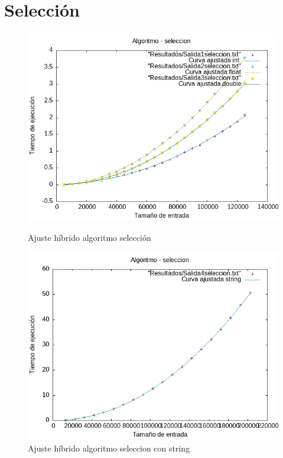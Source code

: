 \documentclass[11pt,openany]{book}
\begin{document}
\section*{Selección}
\begin{figure}[H]
    \begin{minipage}{0.5\textwidth}
        \centering
        \includegraphics[width=\linewidth]{assets/AjusteHibrido_latex/Hibridoseleccion/seleccion_hib.png}
        \caption{Ajuste híbrido algoritmo selección}
        \label{fig:seleccion}
    \end{minipage}%
    \begin{minipage}{0.5\textwidth}
        \centering
        \includegraphics[width=\linewidth]{assets/AjusteHibrido_latex/Hibridoseleccion/seleccionstring_hib.png}
        \caption{Ajuste híbrido algoritmo seleccion con string}
        \label{fig:Seleccion}
    \end{minipage}
\end{figure}
\end{document}
